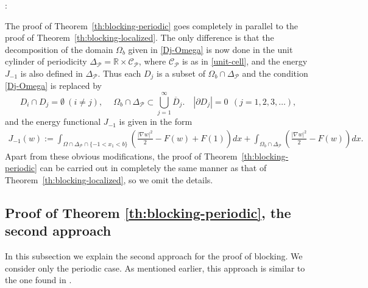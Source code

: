 \documentclass[a4paper,12pt,fullpage]{article}
\numberwithin{equation}{section}
\def\R{{\mathbb R}}
\begin{document}
\vskip 8pt
\noindent
{}:
\vskip 6pt

The proof of Theorem~\ref{th:blocking-periodic} goes completely in parallel to the proof of Theorem~\ref{th:blocking-localized}. The only difference is that the decomposition of the domain $\Omega_b$ given in \eqref{Dj-Omega} is now done in the unit cylinder of periodicity $\Delta_{\mathcal P}=\R\times{\mathcal C}_{\mathcal P}$, where ${\mathcal C}_{\mathcal P}$ is as in \eqref{unit-cell}, and the energy $J_{-1}$ is also defined in $\Delta_{\mathcal P}$. Thus each $D_j$ is a subset of $\Omega_b\cap\Delta_{\mathcal P}$ and the condition \eqref{Dj-Omega} is replaced by 
\begin{equation}\label{Dj-Omega-P}
D_i\cap D_j=\emptyset\ (i\ne j),\quad \ \Omega_b\cap\Delta_{\mathcal P}  \subset \bigcup_{j=1}^\infty \overline{D}_j.\quad |\partial D_j| =0 \ \ (j=1,2,3,\ldots),
\end{equation}
and the energy functional $J_{-1}$ is given in the form
\[
\begin{split}
J_{-1}(w):=\int_{\Omega\cap\Delta_{\mathcal P}\cap\{-1<x_1<b\}}\left( \frac{|\nabla w|^2}{2}-F(w)+F(1)\right)dx+\int_{\Omega_b \cap\Delta_{\mathcal P}}\left( \frac{|\nabla w|^2}{2}-F(w)\right)dx.
\end{split}
\]
Apart from these obvious modifications, the proof of Theorem~\ref{th:blocking-periodic} can be carried out in completely the same manner as that of Theorem~\ref{th:blocking-localized}, so we omit the details.


\subsection{Proof of Theorem \ref{th:blocking-periodic}, the second approach}\label{ss:blocking2}

In this subsection we explain the second approach for the proof of blocking. We consider only the periodic case. As mentioned earlier, this approach is similar to the one found in \cite{BBC}. 
\end{document}
